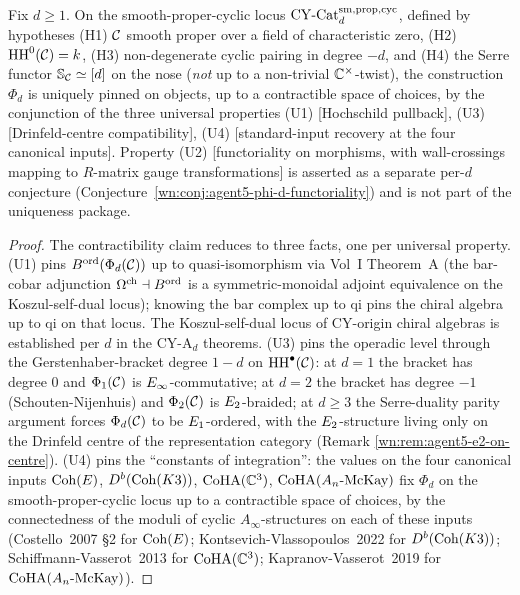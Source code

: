 \begin{theorem}
\ClaimStatusTheorem\label{wn:thm:agent5-characterisation-on-objects}
Fix $d \ge 1$. On the smooth-proper-cyclic locus
$\mathrm{CY}\text{-}\mathrm{Cat}_d^{\mathrm{sm,prop,cyc}}$, defined by hypotheses
(H1) $\mathcal{C}$ smooth proper over a field of characteristic zero,
(H2) $\mathrm{HH}^0(\mathcal{C}) = k$,
(H3) non-degenerate cyclic pairing in degree $-d$, and
(H4) the Serre functor $\mathbb{S}_{\mathcal{C}} \simeq [d]$ on the nose
(\emph{not} up to a non-trivial $\mathbb{C}^\times$-twist), the construction
$\Phi_d$ is uniquely pinned on objects, up to a contractible space of
choices, by the conjunction of the three universal properties
(U1) [Hochschild pullback], (U3) [Drinfeld-centre compatibility],
(U4) [standard-input recovery at the four canonical inputs]. Property
(U2) [functoriality on morphisms, with wall-crossings mapping to
$R$-matrix gauge transformations] is asserted as a separate per-$d$
conjecture (Conjecture~\ref{wn:conj:agent5-phi-d-functoriality}) and is
not part of the uniqueness package.
\end{theorem}

\begin{proof}
The contractibility claim reduces to three facts, one per universal
property.
(U1) pins $B^{\mathrm{ord}}(\Phi_d(\mathcal{C}))$ up to quasi-isomorphism via Vol~I
Theorem~A (the bar-cobar adjunction
$\Omega^{\mathrm{ch}} \dashv B^{\mathrm{ord}}$ is a symmetric-monoidal adjoint
equivalence on the Koszul-self-dual locus); knowing the bar complex up
to qi pins the chiral algebra up to qi on that locus. The Koszul-self-dual
locus of CY-origin chiral algebras is established per $d$ in the CY-A$_d$
theorems.
(U3) pins the operadic level through the Gerstenhaber-bracket degree
$1 - d$ on $\mathrm{HH}^\bullet(\mathcal{C})$: at $d = 1$ the bracket has degree $0$
and $\Phi_1(\mathcal{C})$ is $E_\infty$-commutative; at $d = 2$ the bracket has
degree $-1$ (Schouten-Nijenhuis) and $\Phi_2(\mathcal{C})$ is $E_2$-braided;
at $d \ge 3$ the Serre-duality parity argument forces $\Phi_d(\mathcal{C})$ to
be $E_1$-ordered, with the $E_2$-structure living only on the
Drinfeld centre of the representation category (Remark
\ref{wn:rem:agent5-e2-on-centre}).
(U4) pins the ``constants of integration'': the values on the four
canonical inputs $\mathrm{Coh}(E)$, $D^b(\mathrm{Coh}(K3))$, $\mathrm{CoHA}(\mathbb{C}^3)$,
$\mathrm{CoHA}(A_n\text{-McKay})$ fix $\Phi_d$ on the smooth-proper-cyclic locus
up to a contractible space of choices, by the connectedness of the
moduli of cyclic $A_\infty$-structures on each of these inputs
(Costello~2007 \S2 for $\mathrm{Coh}(E)$; Kontsevich-Vlassopoulos~2022 for
$D^b(\mathrm{Coh}(K3))$; Schiffmann-Vasserot~2013 for $\mathrm{CoHA}(\mathbb{C}^3)$;
Kapranov-Vasserot~2019 for $\mathrm{CoHA}(A_n\text{-McKay})$).
\end{proof}

